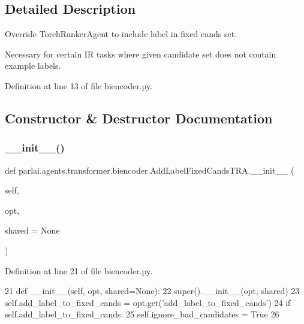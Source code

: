 \subsection{Detailed Description}
\begin{DoxyVerb}Override TorchRankerAgent to include label in fixed cands set.

Necessary for certain IR tasks where given candidate set does not contain example
labels.
\end{DoxyVerb}
 

Definition at line 13 of file biencoder.\+py.



\subsection{Constructor \& Destructor Documentation}
\mbox{\label{classparlai_1_1agents_1_1transformer_1_1biencoder_1_1AddLabelFixedCandsTRA_a591f1ad203927b07db58520a7295132c}} 
\subsubsection{\texorpdfstring{\+\_\+\+\_\+init\+\_\+\+\_\+()}{\_\_init\_\_()}}
{\footnotesize\ttfamily def parlai.\+agents.\+transformer.\+biencoder.\+Add\+Label\+Fixed\+Cands\+T\+R\+A.\+\_\+\+\_\+init\+\_\+\+\_\+ (\begin{DoxyParamCaption}\item[{}]{self,  }\item[{}]{opt,  }\item[{}]{shared = {\ttfamily None} }\end{DoxyParamCaption})}



Definition at line 21 of file biencoder.\+py.


\begin{DoxyCode}
21     \textcolor{keyword}{def }\_\_init\_\_(self, opt, shared=None):
22         super().\_\_init\_\_(opt, shared)
23         self.add\_label\_to\_fixed\_cands = opt.get(\textcolor{stringliteral}{'add\_label\_to\_fixed\_cands'})
24         \textcolor{keywordflow}{if} self.add\_label\_to\_fixed\_cands:
25             self.ignore\_bad\_candidates = \textcolor{keyword}{True}
26 
\end{DoxyCode}


